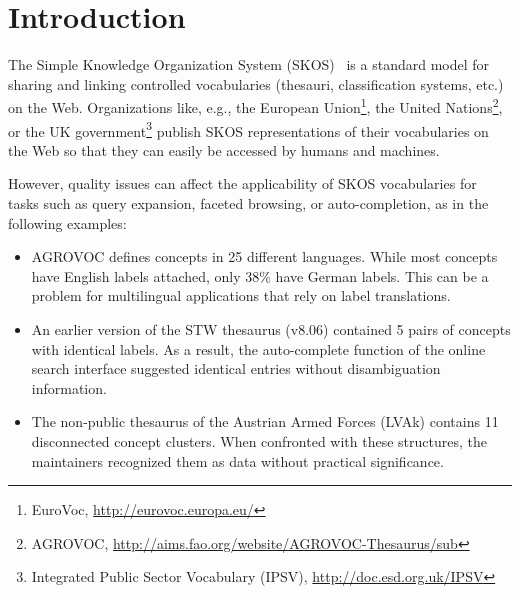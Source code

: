 
\section{Introduction}\label{sec:introduction}


The Simple Knowledge Organization System (SKOS)~\cite{SkosReference2008} is a standard model for sharing and linking controlled vocabularies (thesauri, classification systems, etc.) on the Web. Organizations like, e.g., the European Union\footnote{EuroVoc, \url{http://eurovoc.europa.eu/}}, the United Nations\footnote{AGROVOC, \url{http://aims.fao.org/website/AGROVOC-Thesaurus/sub}}, or the UK government\footnote{Integrated Public Sector Vocabulary (IPSV), \url{http://doc.esd.org.uk/IPSV}} publish SKOS representations of their vocabularies on the Web so that they can easily be accessed by humans and machines.

However, quality issues can affect the applicability of SKOS vocabularies for tasks such as query expansion, faceted browsing, or auto-completion, as in the following examples: 

\begin{itemize}

	\item AGROVOC defines concepts in 25 different languages. While most concepts have English labels attached, only 38\% have German labels. This can be a problem for multilingual applications that rely on label translations.

	\item An earlier version of the STW thesaurus (v8.06) contained 5 pairs of concepts with identical labels. As a result, the auto-complete function of the online search interface suggested identical entries without disambiguation information.

	\item The non-public thesaurus of the Austrian Armed Forces (LVAk) contains 11 disconnected concept clusters. When confronted with these structures, the maintainers recognized them as data without practical significance.
	
\end{itemize}


